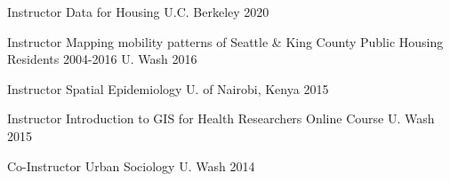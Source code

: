 



\begin{cvhonors}

  \cvhonor
    {Instructor} %
    {Data for Housing} %
    {U.C. Berkeley} %
    {2020} %

  \cvhonor
    {Instructor} %
    {Mapping mobility patterns of Seattle \& King County Public Housing Residents 2004-2016} %
    {U. Wash} %
    {2016} %

  \cvhonor
    {Instructor} %
    {Spatial Epidemiology} %
    {U. of Nairobi, Kenya} %
    {2015} %

  \cvhonor
    {Instructor} %
    {Introduction to GIS for Health Researchers Online Course} %
    {U. Wash} %
    {2015} %

  \cvhonor
    {Co-Instructor} %
    {Urban Sociology} %
    {U. Wash} %
    {2014} %





    
\end{cvhonors}